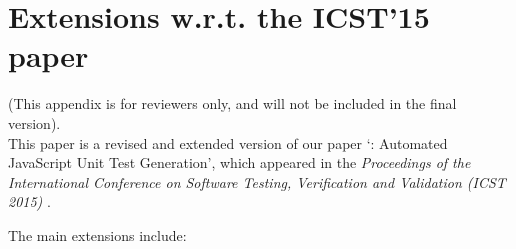 \section{Extensions w.r.t. the ICST'15 paper}
(This appendix is for reviewers only, and will not be included in the final version).\\

This paper is a revised and extended version of our paper `\tool: Automated JavaScript Unit Test Generation',  which appeared in the \emph{Proceedings of the International Conference on Software Testing, Verification and Validation (ICST 2015)} \cite{mirshokraie:icst15}.

The main extensions include:

